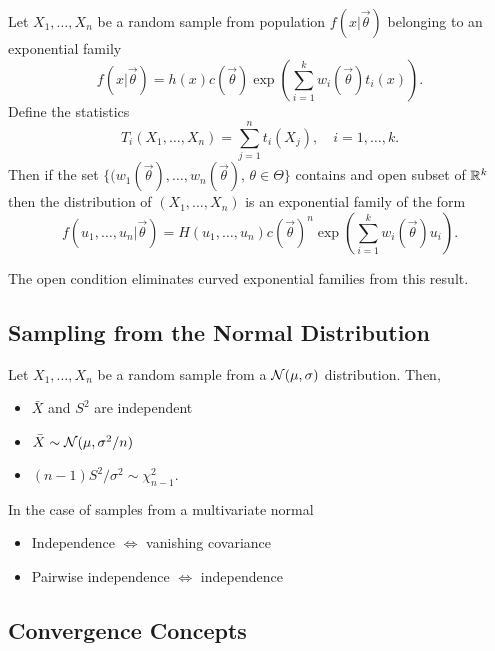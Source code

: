 \begin{theorem}
    Let $X_1, \dots, X_n$ be a random sample from population $f(x\vert{}\vec{\theta})$ belonging to an exponential family
    \[
        f(x \vert{} \vec{\theta}) = h(x)c(\vec{\theta}) \exp\left(\sum_{i=1}^k w_i(\vec{\theta})t_i(x)\right).
    \]
    Define the statistics 
    \[
        T_i(X_1, \dots, X_n) = \sum_{j=1}^n t_i(X_j), \quad i=1, \dots, k.
    \]
    Then if the set $\{(w_1(\vec{\theta}), \dots, w_n(\vec{\theta}), \, \theta \in \Theta\}$ contains and open subset of $\mathbb{R}{}^k$ then the distribution of $(X_1, \dots, X_n)$ is an exponential family of the form
    \[
        f(u_1, \dots, u_n \vert{} \vec{\theta}) = H(u_1, \dots, u_n) c(\vec{\theta})^n \exp\left(\sum_{i=1}^kw_i(\vec{\theta})u_i\right).
    \]
\end{theorem}

\begin{remark}
    The open condition eliminates curved exponential families from this result.
\end{remark}

\subsection{Sampling from the Normal Distribution}

\begin{theorem}
    Let $X_1, \dots, X_n$ be a random sample from a $\mathcal{N}(\mu, \sigma)$ distribution. Then,
    \begin{itemize}
        \item $\bar{X}$ and $S^2$ are independent
        \item $\bar{X} \sim \mathcal{N}(\mu, \sigma^2/n)$
        \item $(n-1)S^2/\sigma^2 \sim \chi^2_{n-1}$.
    \end{itemize}
\end{theorem}

\begin{lemma}
    In the case of samples from a multivariate normal
    \begin{itemize}
        \item Independence $\iff$ vanishing covariance
        \item Pairwise independence $\iff$ independence
    \end{itemize}
\end{lemma}


\subsection{Convergence Concepts}

